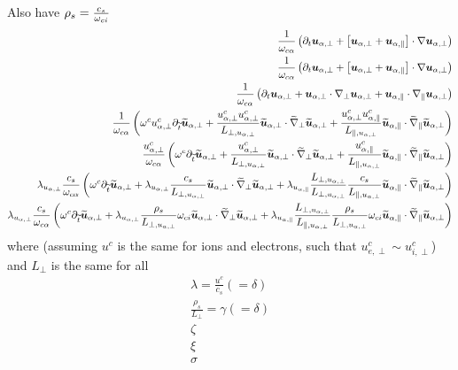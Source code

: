 Also have
$\rho_s=\frac{c_s}{\omega_{ci}}$
%
\begin{align*}
 \frac{1}{\omega_{c\alpha}}
 \left(
 \partial_t \boldsymbol{u}_{\alpha,\perp}
 + \left[\boldsymbol{u}_{\alpha,\perp}
 + \boldsymbol{u}_{\alpha,\|}\right]\cdot\nabla\boldsymbol{u}_{\alpha,\perp}
 \right)
 \\
 \frac{1}{\omega_{c\alpha}}
 \left(
 \partial_t \boldsymbol{u}_{\alpha,\perp}
 + \left[\boldsymbol{u}_{\alpha,\perp}
 + \boldsymbol{u}_{\alpha,\|}\right]\cdot\nabla\boldsymbol{u}_{\alpha,\perp}
 \right)
 \\
 \frac{1}{\omega_{c\alpha}}
 \left(
 \partial_t \boldsymbol{u}_{\alpha,\perp}
 + \boldsymbol{u}_{\alpha,\perp}\cdot\nabla_\perp\boldsymbol{u}_{\alpha,\perp}
 + \boldsymbol{u}_{\alpha,\|}\cdot\nabla_\|\boldsymbol{u}_{\alpha,\perp}
 \right)
 \\
 \frac{1}{\omega_{c\alpha}}
 \left(
 \omega^cu^c_{\alpha,\perp}
 \partial_{\widetilde{ t}} \widetilde{ \boldsymbol{u}}_{\alpha,\perp}
 + \frac{u_{\alpha,\perp}^{c}u_{\alpha,\perp}^{c}}{L_{\perp, u_{\alpha,\perp}}}
 \widetilde{ \boldsymbol{u}}_{\alpha,\perp}\cdot\widetilde{ \nabla}_\perp\widetilde{ \boldsymbol{u}}_{\alpha,\perp}
 + \frac{u^c_{\alpha,\perp}u^c_{\alpha,\|}}{L_{\|, u_{\alpha,\perp}}}
 \widetilde{ \boldsymbol{u}}_{\alpha,\|}\cdot\widetilde{ \nabla}_\|\widetilde{ \boldsymbol{u}}_{\alpha,\perp}
 \right)
 \\
 \frac{u^c_{\alpha,\perp}}{\omega_{c\alpha}}
 \left(
 \omega^c
 \partial_{\widetilde{ t}} \widetilde{ \boldsymbol{u}}_{\alpha,\perp}
 + \frac{u^c_{\alpha,\perp}}{L_{\perp, u_{\alpha,\perp}}}
 \widetilde{ \boldsymbol{u}}_{\alpha,\perp}\cdot\widetilde{ \nabla}_\perp\widetilde{ \boldsymbol{u}}_{\alpha,\perp}
 + \frac{u^c_{\alpha,\|}}{L_{\|, u_{\alpha,\perp}}}
 \widetilde{ \boldsymbol{u}}_{\alpha,\|}\cdot\widetilde{ \nabla}_\|\widetilde{ \boldsymbol{u}}_{\alpha,\perp}
 \right)
 \\
 \lambda_{u_{\alpha,\perp}}
 \frac{c_s}{\omega_{c\alpha}}
 \left(
 \omega^c
 \partial_{\widetilde{ t}} \widetilde{ \boldsymbol{u}}_{\alpha,\perp}
 +
 \lambda_{u_{\alpha,\perp}}
 \frac{ c_s }{L_{\perp, u_{\alpha,\perp}}}
 \widetilde{ \boldsymbol{u}}_{\alpha,\perp}\cdot\widetilde{ \nabla}_\perp\widetilde{ \boldsymbol{u}}_{\alpha,\perp}
 +
 \lambda_{u_{\alpha,\|}}
 \frac{L_{\perp, u_{\alpha,\perp}}}{L_{\perp, u_{\alpha,\perp}}}
 \frac{c_s}{L_{\|, u_{\alpha,\perp}}}
 \widetilde{ \boldsymbol{u}}_{\alpha,\|}\cdot\widetilde{ \nabla}_\|\widetilde{ \boldsymbol{u}}_{\alpha,\perp}
 \right)
 \\
 \lambda_{u_{\alpha,\perp}}
 \frac{c_s}{\omega_{c\alpha}}
 \left(
 \omega^c
 \partial_{\widetilde{ t}} \widetilde{ \boldsymbol{u}}_{\alpha,\perp}
 +
 \lambda_{u_{\alpha,\perp}}
 \frac{ \rho_s }{L_{\perp, u_{\alpha,\perp}}}
 \omega_{ci}
 \widetilde{ \boldsymbol{u}}_{\alpha,\perp}\cdot\widetilde{ \nabla}_\perp\widetilde{ \boldsymbol{u}}_{\alpha,\perp}
 +
 \lambda_{u_{\alpha,\|}}
 \frac{L_{\perp, u_{\alpha,\perp}}}{L_{\|, u_{\alpha,\perp}}}
 \frac{\rho_s}{L_{\perp, u_{\alpha,\perp}}}
 \omega_{ci}
 \widetilde{ \boldsymbol{u}}_{\alpha,\|}\cdot\widetilde{ \nabla}_\|\widetilde{ \boldsymbol{u}}_{\alpha,\perp}
 \right)
\end{align*}
%
where (assuming $u^c$ is the same for ions and electrons, such that $u^c_{e,\perp}\sim u^c_{i,\perp}$) and $L_\perp$ is the same for all
\begin{align*}
    \lambda = \frac{u^c}{c_s} (= \delta)\\
    \frac{ \rho_s }{L_{\perp}} = \gamma(= \delta)\\
    \zeta\\
    \xi\\
    \sigma\\
\end{align*}
